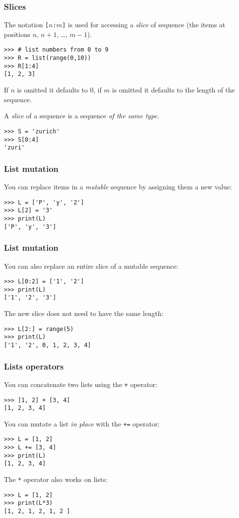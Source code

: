 \documentclass[english,serif,mathserif,xcolor=pdftex,dvipsnames,table]{beamer}
\begin{document}
\begin{frame}[fragile]
  \frametitle{Slices}
  The notation \texttt{[$n$:$m$]} is used for accessing a \emph{slice}
  of sequence (the items at positions $n$, $n+1$, \ldots, $m-1$).

\begin{lstlisting}
>>> # list numbers from 0 to 9
>>> R = list(range(0,10))
>>> R[1:4]
[1, 2, 3]
\end{lstlisting}

  \+
  If $n$ is omitted it defaults to 0, if $m$ is omitted it defaults to
  the length of the sequence.

  \+ A \textit{slice} of a sequence is a sequence \textit{of the same
  type}.
\begin{lstlisting}
>>> S = 'zurich'
>>> S[0:4]
'zuri'
\end{lstlisting}
\end{frame}


\begin{frame}[fragile]
  \frametitle{List mutation}
  You can replace items in a \emph{mutable} sequence by assigning them
  a new value:
\begin{lstlisting}
>>> L = ['P', 'y', '2']
>>> L[2] = '3'
>>> print(L)
['P', 'y', '3']
\end{lstlisting}

\end{frame}
\begin{frame}[fragile]
  \frametitle{List mutation}

You can also replace an entire slice of a mutable sequence:
\begin{lstlisting}
>>> L[0:2] = ['1', '2']
>>> print(L)
['1', '2', '3']
\end{lstlisting}

The new slice does not need to have the same length:
\begin{lstlisting}
>>> L[2:] = range(5)
>>> print(L)
['1', '2', 0, 1, 2, 3, 4]
\end{lstlisting}
\end{frame}


\begin{frame}[fragile]
  \frametitle{Lists operators}
  You can concatenate two lists using the \texttt{+} operator:
  \begin{lstlisting}
>>> [1, 2] + [3, 4]
[1, 2, 3, 4]
  \end{lstlisting}

  \+
  You can mutate a list \emph{in place} with the \texttt{+=} operator:
  \begin{lstlisting}
>>> L = [1, 2]
>>> L += [3, 4]
>>> print(L)
[1, 2, 3, 4]
  \end{lstlisting}

\+
The \texttt{*} operator also works on lists:
  \begin{lstlisting}
>>> L = [1, 2]
>>> print(L*3)
[1, 2, 1, 2, 1, 2 ]
  \end{lstlisting}
\end{frame}
\end{document}
